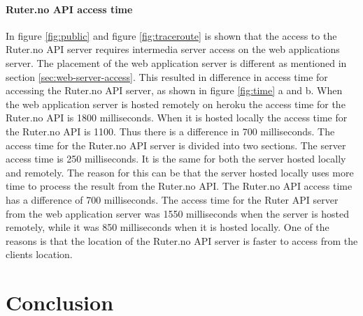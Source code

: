 \documentclass[10pt,a4paper]{article}
\begin{document}
\paragraph{Ruter.no API access time}
In figure \ref{fig:public} and figure \ref{fig:traceroute} is shown that the access to the Ruter.no API server requires intermedia server access on the web applications server. The placement of the web application server is different as mentioned in section \ref{sec:web-server-access}. This resulted in difference in access time for accessing the Ruter.no API server, as shown in figure \ref{fig:time} a and b. When the web application server is hosted remotely on heroku the access time for the Ruter.no API is 1800 milliseconds. When it is hosted locally the access time for the Ruter.no API is 1100. Thus there is a difference in 700 milliseconds. The access time for the Ruter.no API server is divided into two sections. The server access time is 250 milliseconds. It is the same for both the server hosted locally and remotely. The reason for this can be that the server hosted locally uses more time to process the result from the Ruter.no API. The Ruter.no API access time has a difference of 700 milliseconds. The access time for the Ruter API server from the web application server was 1550 milliseconds when the server is hosted remotely, while it was 850 milliseconds when it is hosted locally. One of the reasons is that the location of the Ruter.no API server is faster to access from the clients location. 



\section{Conclusion}
\printbibliography
\end{document}
